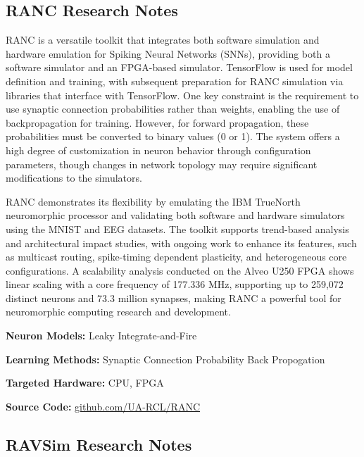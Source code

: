 \subsection*{RANC Research Notes}\label{RANC}

RANC is a versatile toolkit that integrates both software simulation and hardware emulation for Spiking Neural Networks (SNNs), providing both a software simulator and an FPGA-based simulator. TensorFlow is used for model definition and training, with subsequent preparation for RANC simulation via libraries that interface with TensorFlow. One key constraint is the requirement to use synaptic connection probabilities rather than weights, enabling the use of backpropagation for training. However, for forward propagation, these probabilities must be converted to binary values (0 or 1). The system offers a high degree of customization in neuron behavior through configuration parameters, though changes in network topology may require significant modifications to the simulators.

RANC demonstrates its flexibility by emulating the IBM TrueNorth neuromorphic processor and validating both software and hardware simulators using the MNIST and EEG datasets. The toolkit supports trend-based analysis and architectural impact studies, with ongoing work to enhance its features, such as multicast routing, spike-timing dependent plasticity, and heterogeneous core configurations. A scalability analysis conducted on the Alveo U250 FPGA shows linear scaling with a core frequency of 177.336 MHz, supporting up to 259,072 distinct neurons and 73.3 million synapses, making RANC a powerful tool for neuromorphic computing research and development.

\begin{tcolorbox}[enhanced,attach boxed title to top center={yshift=-3mm,yshifttext=-1mm}, colback=blue!5!white,colframe=blue!75!black,colbacktitle=red!80!black, title=RANC at a Glance,fonttitle=\bfseries, boxed title style={size=small,colframe=red!50!black} ]

\textbf{Neuron Models:} Leaky Integrate-and-Fire

\textbf{Learning Methods:} Synaptic Connection Probability Back Propogation  

\textbf{Targeted Hardware:} CPU, FPGA 

\textbf{Source Code:} \href{https://github.com/UA-RCL/RANC}{github.com/UA-RCL/RANC}
\end{tcolorbox}
\subsection*{RAVSim Research Notes}\label{RAVSim}

